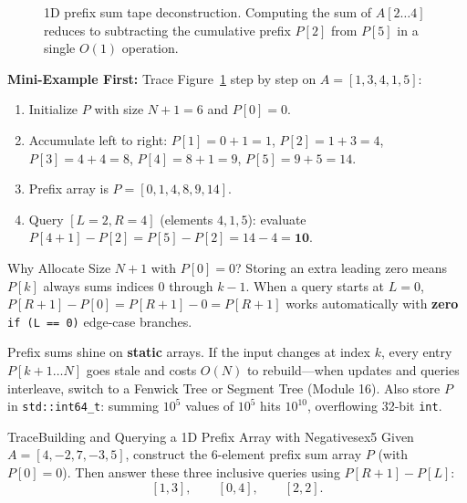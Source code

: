 \documentclass[11pt,a4paper]{article}
\theoremstyle{definition}
\newcommand{\examplebeat}{\textbf{\color{primaryblue}Mini-Example First:} }
\begin{document}
\begin{figure}[htbp]
\caption{1D prefix sum tape deconstruction. Computing the sum of $A[2 \dots 4]$ reduces to subtracting the cumulative prefix $P[2]$ from $P[5]$ in a single $O(1)$ operation.}
\label{fig:prefix-sum-1d}
\end{figure}

\examplebeat Trace Figure~\ref{fig:prefix-sum-1d} step by step on $A = [1, 3, 4, 1, 5]$:
\begin{enumerate}
    \item Initialize $P$ with size $N + 1 = 6$ and $P[0] = 0$.
    \item Accumulate left to right: $P[1] = 0 + 1 = 1$,\; $P[2] = 1 + 3 = 4$,\; $P[3] = 4 + 4 = 8$,\; $P[4] = 8 + 1 = 9$,\; $P[5] = 9 + 5 = 14$.
    \item Prefix array is $P = [0, 1, 4, 8, 9, 14]$.
    \item Query $[L = 2, R = 4]$ (elements $4, 1, 5$): evaluate $P[4 + 1] - P[2] = P[5] - P[2] = 14 - 4 = \mathbf{10}$.
\end{enumerate}

\begin{calloutbox}{Why Allocate Size $N + 1$ with $P[0] = 0$?}
Storing an extra leading zero means $P[k]$ always sums indices $0$ through $k - 1$. When a query starts at $L = 0$, $P[R + 1] - P[0] = P[R + 1] - 0 = P[R + 1]$ works automatically with \textbf{zero} \texttt{if (L == 0)} edge-case branches.
\end{calloutbox}

\begin{watchoutbox}
Prefix sums shine on \textbf{static} arrays. If the input changes at index $k$, every entry $P[k + 1 \dots N]$ goes stale and costs $O(N)$ to rebuild---when updates and queries interleave, switch to a Fenwick Tree or Segment Tree (Module 16). Also store $P$ in \texttt{std::int64\_t}: summing $10^5$ values of $10^5$ hits $10^{10}$, overflowing 32-bit \texttt{int}.
\end{watchoutbox}

\begin{tryitbox}{Trace}{Building and Querying a 1D Prefix Array with Negatives}{ex5}
Given $A = [4, -2, 7, -3, 5]$, construct the $6$-element prefix sum array $P$ (with $P[0] = 0$). Then answer these three inclusive queries using $P[R + 1] - P[L]$:
\[
    [1, 3], \qquad [0, 4], \qquad [2, 2].
\]
\end{tryitbox}
\end{document}
